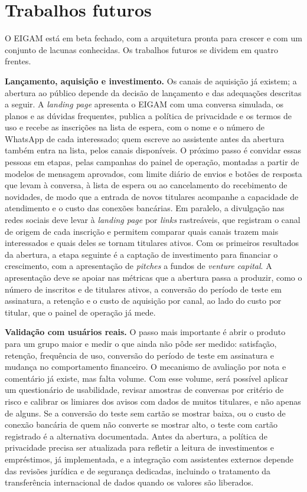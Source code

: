 \chapter{Trabalhos futuros}\label{chap:futuros}

O EIGAM está em beta fechado, com a arquitetura pronta para crescer e com um conjunto de lacunas conhecidas. Os trabalhos futuros se dividem em quatro frentes.

\textbf{Lançamento, aquisição e investimento.} Os canais de aquisição já existem; a abertura ao público depende da decisão de lançamento e das adequações descritas a seguir. A \textit{landing page} apresenta o EIGAM com uma conversa simulada, os planos e as dúvidas frequentes, publica a política de privacidade e os termos de uso e recebe as inscrições na lista de espera, com o nome e o número de WhatsApp de cada interessado; quem escreve ao assistente antes da abertura também entra na lista, pelos canais disponíveis. O próximo passo é convidar essas pessoas em etapas, pelas campanhas do painel de operação, montadas a partir de modelos de mensagem aprovados, com limite diário de envios e botões de resposta que levam à conversa, à lista de espera ou ao cancelamento do recebimento de novidades, de modo que a entrada de novos titulares acompanhe a capacidade de atendimento e o custo das conexões bancárias. Em paralelo, a divulgação nas redes sociais deve levar à \textit{landing page} por \textit{links} rastreáveis, que registram o canal de origem de cada inscrição e permitem comparar quais canais trazem mais interessados e quais deles se tornam titulares ativos. Com os primeiros resultados da abertura, a etapa seguinte é a captação de investimento para financiar o crescimento, com a apresentação de \textit{pitches} a fundos de \textit{venture capital}. A apresentação deve se apoiar nas métricas que a abertura passa a produzir, como o número de inscritos e de titulares ativos, a conversão do período de teste em assinatura, a retenção e o custo de aquisição por canal, ao lado do custo por titular, que o painel de operação já mede.

\textbf{Validação com usuários reais.} O passo mais importante é abrir o produto para um grupo maior e medir o que ainda não pôde ser medido: satisfação, retenção, frequência de uso, conversão do período de teste em assinatura e mudança no comportamento financeiro. O mecanismo de avaliação por nota e comentário já existe, mas falta volume. Com esse volume, será possível aplicar um questionário de usabilidade, revisar amostras de conversas por critério de risco e calibrar os limiares dos avisos com dados de muitos titulares, e não apenas de alguns. Se a conversão do teste sem cartão se mostrar baixa, ou o custo de conexão bancária de quem não converte se mostrar alto, o teste com cartão registrado é a alternativa documentada. Antes da abertura, a política de privacidade precisa ser atualizada para refletir a leitura de investimentos e empréstimos, já implementada, e a integração com assistentes externos depende das revisões jurídica e de segurança dedicadas, incluindo o tratamento da transferência internacional de dados quando os valores são liberados.

